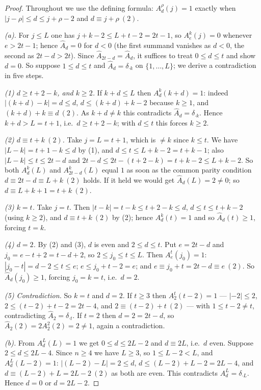 \documentclass[reqno]{amsart}
\theoremstyle{plain}
\theoremstyle{definition}
\begin{document}
\begin{proof}
Throughout we use the defining formula: $A^{\rho}_d(j)=1$ exactly when
$|j-\rho|\le d\le j+\rho-2$ and $d\equiv j+\rho\ (2)$.

\emph{(a).}  For $j\le L$ one has $j+k-2\le L+t-2=2t-1$, so
$A^{k}_e(j)=0$ whenever $e>2t-1$; hence $\hat A_d=0$ for $d<0$ (the first
summand vanishes as $d<0$, the second as $2t-d>2t$).  Since
$\hat A_{2t-d}=\hat A_d$, it suffices to treat $0\le d\le t$ and show $d=0$.
So suppose $1\le d\le t$ and $\hat A_d=\delta_{\cdot k}$ on $\{1,\dots,L\}$;
we derive a contradiction in five steps.

\emph{(1) $d\ge t+2-k$, and $k\ge2$.}  If $k+d\le L$ then
$A^{k}_d(k+d)=1$: indeed $|(k+d)-k|=d\le d$, $d\le(k+d)+k-2$ because
$k\ge1$, and $(k+d)+k\equiv d\ (2)$.  As $k+d\ne k$ this contradicts
$\hat A_d=\delta_{\cdot k}$.  Hence $k+d>L=t+1$, i.e.\ $d\ge t+2-k$; with
$d\le t$ this forces $k\ge2$.

\emph{(2) $d\equiv t+k\ (2)$.}  Take $j=L=t+1$, which is $\ne k$ since
$k\le t$.  We have $|L-k|=t+1-k\le d$ by (1), and $d\le t\le L+k-2=t+k-1$;
also $|L-k|\le t\le 2t-d$ and $2t-d\le 2t-(t+2-k)=t+k-2\le L+k-2$.  So both
$A^{k}_d(L)$ and $A^{k}_{2t-d}(L)$ equal $1$ as soon as the common parity
condition $d\equiv 2t-d\equiv L+k\ (2)$ holds.  If it held we would get
$\hat A_d(L)=2\ne0$; so $d\equiv L+k+1=t+k\ (2)$.

\emph{(3) $k=t$.}  Take $j=t$.  Then $|t-k|=t-k\le t+2-k\le d$,
$d\le t\le t+k-2$ (using $k\ge2$), and $d\equiv t+k\ (2)$ by (2); hence
$A^{k}_d(t)=1$ and so $\hat A_d(t)\ge1$, forcing $t=k$.

\emph{(4) $d=2$.}  By (2) and (3), $d$ is even and $2\le d\le t$.  Put
$e=2t-d$ and $j_0=e-t+2=t-d+2$, so $2\le j_0\le t\le L$.  Then
$A^{t}_e(j_0)=1$: $|j_0-t|=d-2\le t\le e$; $e\le j_0+t-2=e$; and
$e\equiv j_0+t=2t-d\equiv e\ (2)$.  So $\hat A_d(j_0)\ge1$, forcing
$j_0=k=t$, i.e.\ $d=2$.

\emph{(5) Contradiction.}  So $k=t$ and $d=2$.  If $t\ge3$ then
$A^{t}_2(t-2)=1$ --- $|{-2}|\le2$, $2\le(t-2)+t-2=2t-4$, and
$2\equiv(t-2)+t\ (2)$ --- with $1\le t-2\ne t$, contradicting
$\hat A_2=\delta_{\cdot t}$.  If $t=2$ then $d=2=2t-d$, so
$\hat A_2(2)=2A^{2}_2(2)=2\ne1$, again a contradiction.

\emph{(b).}  From $A^{L}_d(L)=1$ we get $0\le d\le 2L-2$ and $d\equiv2L$,
i.e.\ $d$ even.  Suppose $2\le d\le2L-4$.  Since $n\ge4$ we have $L\ge3$, so
$1\le L-2<L$, and $A^{L}_d(L-2)=1$: $|(L-2)-L|=2\le d$,
$d\le(L-2)+L-2=2L-4$, and $d\equiv(L-2)+L=2L-2\ (2)$ as both are even.  This
contradicts $A^{L}_d=\delta_{\cdot L}$.  Hence $d=0$ or $d=2L-2$.
\end{proof}
\end{document}
